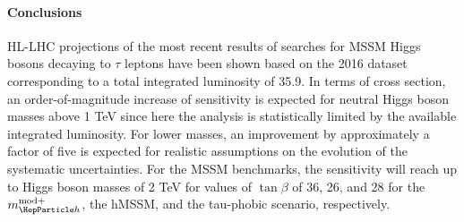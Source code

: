 \paragraph{Conclusions}
\label{sec:conclusions}
%
HL-LHC projections of the most recent results of searches for MSSM Higgs bosons decaying to $\tau$ leptons have been shown 
based on the 2016 dataset corresponding to a total integrated luminosity of 35.9\Uifb.
In terms of cross section, 
an order-of-magnitude increase of sensitivity is expected for neutral Higgs boson masses above 1 TeV since here the analysis is statistically limited by the 
available integrated luminosity. For lower masses, an improvement by approximately a factor of five is expected for realistic assumptions on the evolution of 
the systematic uncertainties. For the MSSM benchmarks, the sensitivity will reach up to Higgs boson masses of 2 TeV for values of $\tan \beta$ of 36, 26, and 28  
for the $\mhmodp$, the hMSSM, and the tau-phobic scenario, respectively.
